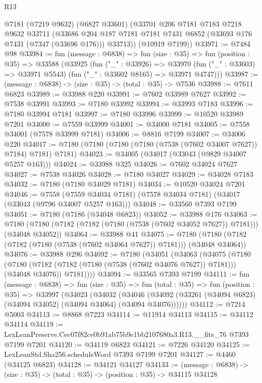 \begin{lexlean}{R13}
\begin{coremodule}
      @7181
      (@7219 @9632)
      (@6827 @33601)
      (@33701
        @206
        @7181
        @7183
        @7218
        @9632
        @33711
        (@33686 @204 @187 @7181 @7181 @7431 @6852 (@33693 @176 @7431 (@7347 (@33696 @176))) @33713))
      (@10919 @7199))
@33971 := @7484 @98
@33984 := fun (message : @6838) =>
  fun (size : @35) =>
  fun (position : @35) =>
  @33588
    (@33925
      (fun ("_" : @33926) =>
      @33970 (fun ("_" : @33603) => @33971 @5543) (fun ("_" : @33602 @8165) => @33971 @4747)))
@33987 := (message : @6838) -> (size : @35) -> (total : @35) -> @7536
@33988 := @7611 @6823
@33989 := @33988 @220
@33991 := @7602 @33989 @7627
@33992 := @7538 @33991
@33993 := @7180 @33992
@33994 := @33993 @7183
@33996 := @7180 @33994 @7181
@33997 := @7180 @33996
@33999 := @10520 @33989 @7201
@34000 := @7559 @33999
@34001 := @34000 @7181
@34005 := @7558 @34001 (@7578 @33999 @7181)
@34006 := @8816 @7199
@34007 := @34006 @220
@34017 := @7180 (@7180 (@7180 (@7180 (@7538 (@7602 @34007 @7627)) @7184) @7181) @7181)
@34023 := @34005 (@34017 (@33043 (@9829 @34007 @5257 @163)))
@34024 := @33988 @325
@34026 := @7602 @34024 @7627
@34027 := @7538 @34026
@34028 := @7180 @34027
@34029 := @34028 @7183
@34032 := @7180 (@7180 @34029 @7181)
@34034 := @10520 @34024 @7201
@34046 := @7558
    (@7559 @34034 @7181)
    (@7578 @34034 @7181)
    (@34017 (@33043 (@9796 @34007 @5257 @163)))
@34048 := @33560 @7393 @7199
@34051 := @7180 (@7186 (@34048 @6823))
@34052 := @33988 @176
@34063 := @7180 (@7180 (@7182 (@7182 (@7180 (@7538 (@7602 @34052 @7627)) @7181))) (@34048 @34052))
@34064 := @33988 @41
@34075 := @7180 (@7180 (@7182 (@7182 (@7180 (@7538 (@7602 @34064 @7627)) @7181))) (@34048 @34064))
@34076 := @33988 @296
@34092 := @7180
    (@34051
      (@34063
        (@34075
          (@7180
            (@7180 (@7182 (@7182 (@7180 (@7538 (@7602 @34076 @7627)) @7181))) (@34048 @34076))
            @7181))))
@34094 := @33565 @7393 @7199
@34111 := fun (message : @6838) =>
  fun (size : @35) =>
  fun (total : @35) =>
  fun (position : @35) =>
  @33997
    (@34023
      (@34032
        (@34046 (@34092 (@33261 (@34094 @6823) (@34094 @34052) (@34094 @34064) (@34094 @34076))))))
@34112 := @7214 @5003
@34113 := @8868 @7223
@34114 := @11914 @34113
@34115 := @34112 @34114
@34119 := LexLeanPreserve.Cec07f82ce0b91ab75b9e1bb2107680a3.R13.__fits_76 @7393 @7199 @7201
@34120 := @34119 @6823
@34121 := @7226 @34120
@34125 := LexLeanStd.Sha256.scheduleWord @7393 @7199 @7201
@34127 := @4460 (@34125 @6823)
@34128 := @34121 @34127
@34133 := (message : @6838) -> (size : @35) -> (total : @35) -> (position : @35) -> @34115 @34128

\end{coremodule}
\end{lexlean}
